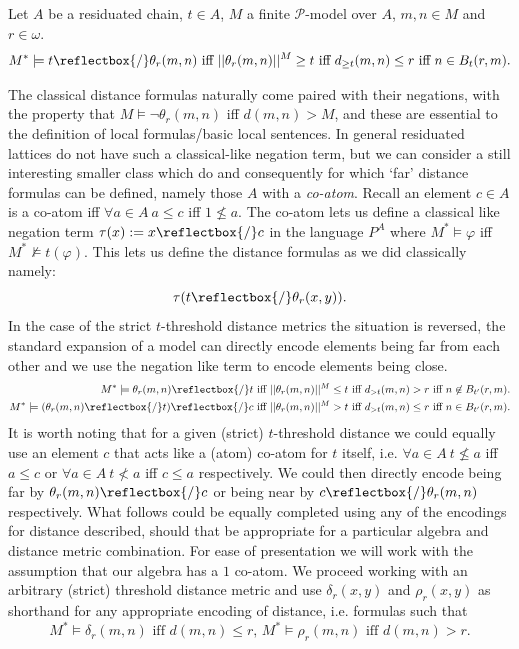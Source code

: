 \documentclass{lmcs} %
\newcommand{\?}{\ensuremath{\mkern0.4\thinmuskip}}
\newcommand{\und}{\mathord{\reflectbox{/}}}%
\let\phi=\varphi
\newcommand{\CP}{\mathcal{P}}
\begin{document}
\begin{cor}
    Let $A$ be a residuated chain, $t\in A$, $M$ a finite $\CP$-model over $A$, $m,n\in M$ and $r\in\omega$. \[M^\ast\models t\und \theta_r(m,n)\text{ iff }||\theta_r(m,n)||^M\geq t\text{ iff }d_{\geq t}(m,n)\leq r\text{ iff }n\in B_t(r,m).\]
\end{cor}
\noindent
The classical distance formulas naturally come paired with their negations, with the property that $M\models\neg \theta_r(m,n)$ iff $d(m,n)>M$, and these are essential to the definition of local formulas/basic local sentences. In general residuated lattices do not have such a classical-like negation term, but we can consider a still interesting smaller class which do and consequently for which `far' distance formulas can be defined, namely those $A$ with a \textit{co-atom}. Recall an element $c\in A$ is a co-atom iff $\forall a\in A\ a\leq c$ iff $1\not\leq a$. The co-atom lets us define a classical like negation term $\tau(x):= x\und c$ in the language $P^A$ where $M^\ast\models\phi$ iff $M^\ast\not\models t(\phi)$. This lets us define the distance formulas as we did classically namely: \[\tau(t\und\theta_r(x,y)).\]
In the case of the strict $t$-threshold distance metrics the situation is reversed, the standard expansion of a model can directly encode elements being far from each other and we use the negation like term to encode elements being close. 
\begin{align*}
    M^\ast\models\theta_r(m,n)\und t\text{ iff }||\theta_r(m,n)||^M\leq t&\text{ iff }d_{>t}(m,n)> r\text{ iff }n\not\in B_{t'}(r,m).\\
    M^\ast\models (\theta_r(m,n)\und t)\und c\text{ iff }||\theta_r(m,n)||^M>t&\text{ iff }d_{>t}(m,n)\leq r\text{ iff }n\in B_{t'}(r,m).
\end{align*}
It is worth noting that for a given (strict) $t$-threshold distance we could equally use an element $c$ that acts like a (atom) co-atom for $t$ itself, i.e. $\forall a\in A\ t\not\leq a$ iff $a\leq c$ or $\forall a\in A\ t\not< a$ iff $c\leq a$ respectively. We could then directly encode being far by $\theta_r(m,n)\und c$ or being near by $c\und \theta_r(m,n)$ respectively. What follows could be equally completed using any of the encodings for distance described, should that be appropriate for a particular algebra and distance metric combination. For ease of presentation we will work with the assumption that our algebra has a $1$ co-atom. We proceed working with an arbitrary (strict) threshold distance metric and use $\delta_r(x,y)$ and $\rho_r(x,y)$ as shorthand for any appropriate encoding of distance, i.e. formulas such that\[M^\ast\models\delta_r(m,n)\text{ iff }d(m,n)\leq r,\, M^\ast\models\rho_r(m,n)\text{ iff }d(m,n)>r.\]
\end{document}
